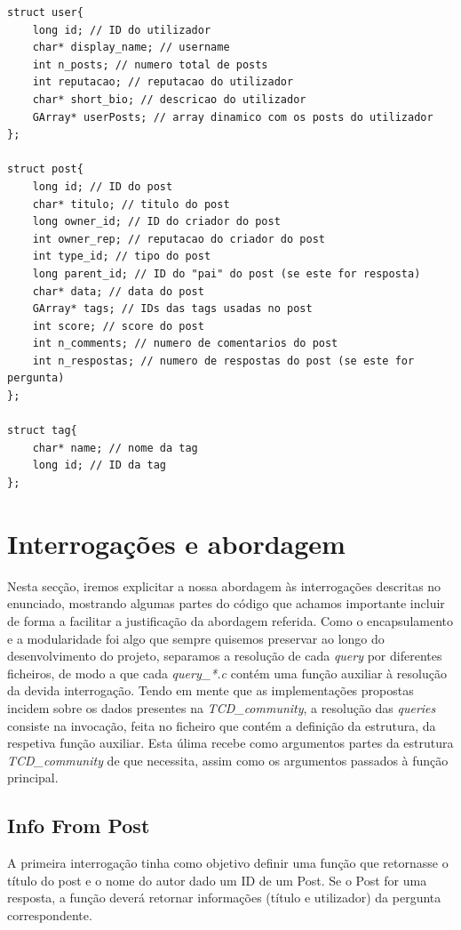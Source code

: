 \documentclass[a4paper, 11pt, oneside]{article}
\begin{document}
\begin{lstlisting}[caption=Definição de estruturas internas,label=structs]
struct user{
	long id; // ID do utilizador
	char* display_name; // username
	int n_posts; // numero total de posts
	int reputacao; // reputacao do utilizador
	char* short_bio; // descricao do utilizador 
	GArray* userPosts; // array dinamico com os posts do utilizador
};

struct post{
	long id; // ID do post
	char* titulo; // titulo do post
	long owner_id; // ID do criador do post
	int owner_rep; // reputacao do criador do post
	int type_id; // tipo do post
	long parent_id; // ID do "pai" do post (se este for resposta)
	char* data; // data do post
	GArray* tags; // IDs das tags usadas no post
	int score; // score do post
	int n_comments; // numero de comentarios do post
	int n_respostas; // numero de respostas do post (se este for pergunta)
};

struct tag{
	char* name; // nome da tag
	long id; // ID da tag
};
\end{lstlisting}

\newpage
\section{Interrogações e abordagem}
\label{queries}
Nesta secção, iremos explicitar a nossa abordagem às interrogações descritas no enunciado, mostrando algumas partes do código que achamos importante incluir de forma a facilitar a justificação da abordagem referida. Como o encapsulamento e a modularidade foi algo que sempre quisemos preservar ao longo do desenvolvimento do projeto, separamos a resolução de cada \textit{query} por diferentes ficheiros, de modo a que cada \textit{query\_*.c} contém uma função auxiliar à resolução da devida interrogação. Tendo em mente que as implementações propostas incidem sobre os dados presentes na \textit{TCD\_community}, a resolução das \textit{queries} consiste na invocação, feita no ficheiro que contém a definição da estrutura, da respetiva função auxiliar. Esta úlima recebe como argumentos partes da estrutura \textit{TCD\_community} de que necessita, assim como os argumentos passados à função principal.

\subsection{Info From Post}
A primeira interrogação tinha como objetivo definir uma função que retornasse o título do post e o nome do autor dado um ID de um Post. Se o Post for uma resposta, a função deverá retornar informações (título e utilizador) da pergunta correspondente.
\end{document}
